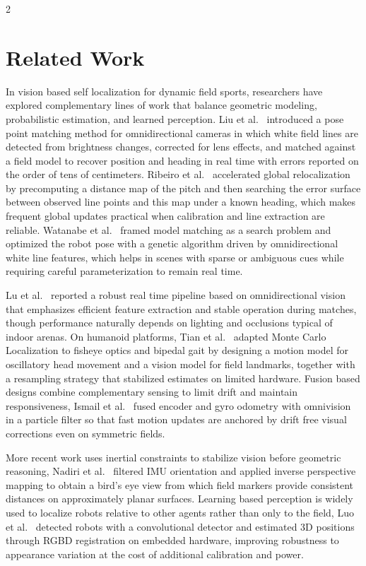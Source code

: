 \documentclass[a4paper]{article}
\begin{document}
\begin{multicols}{2}
\section{Related Work}
\par \noindent In vision based self localization for dynamic field sports, 
researchers have explored complementary lines of work that balance geometric modeling, 
probabilistic estimation, and learned perception.
Liu et al.~\cite{liu2009} introduced a
pose point matching method for omnidirectional cameras in which white field lines are 
detected from brightness changes, corrected for lens effects, and matched against a 
field model to recover position and heading in real time with errors reported on the 
order of tens of centimeters.
Ribeiro et al.~\cite{ribeiro2016} accelerated global 
relocalization by precomputing a distance map of the pitch and then searching 
the error surface between observed line points and this map under a known heading, 
which makes frequent global updates practical when calibration and line extraction
are reliable.
Watanabe et al.~\cite{watanabe2020} framed model matching as a search 
problem and optimized the robot pose with a genetic algorithm driven by omnidirectional 
white line features, which helps in scenes with sparse or ambiguous cues while requiring 
careful parameterization to remain real time.
\par \noindent Lu et al.~\cite{lu2013} reported a robust 
real time pipeline based on omnidirectional vision that emphasizes efficient feature 
extraction and stable operation during matches, though performance naturally depends 
on lighting and occlusions typical of indoor arenas.
On humanoid platforms, Tian et 
al.~\cite{tian2010} adapted Monte Carlo Localization to fisheye optics and bipedal 
gait by designing a motion model for oscillatory head movement and a vision model 
for field landmarks, together with a resampling strategy that stabilized estimates 
on limited hardware.
Fusion based designs combine complementary sensing to limit drift 
and maintain responsiveness, Ismail et al.~\cite{ismail2012} fused encoder and gyro 
odometry with omnivision in a particle filter so that fast motion updates are anchored
by drift free visual corrections even on symmetric fields.
\par \noindent More recent work uses inertial
constraints to stabilize vision before geometric reasoning, Nadiri et al.~\cite{nadiri2025}
filtered IMU orientation and applied inverse perspective mapping to obtain a bird’s eye view
from which field markers provide consistent distances on approximately planar surfaces.
Learning based perception is widely used to localize robots relative to other agents
rather than only to the field, Luo et al.~\cite{luo2020} detected robots with a convolutional
detector and estimated 3D positions through RGBD registration on embedded hardware, improving 
robustness to appearance variation at the cost of additional calibration and power.
\end{multicols} 
\end{document}
